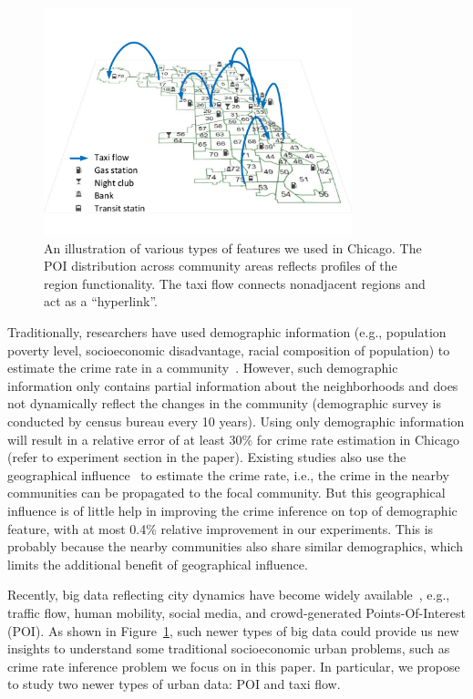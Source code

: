 \begin{figure}[t]
\centering
\includegraphics[width=0.8\textwidth]{fig/demo.pdf}
\caption{An illustration of various types of features we used in Chicago. The POI distribution across community areas reflects profiles of the region functionality. The taxi flow connects nonadjacent regions and act as a ``hyperlink''.}
\label{fig:demo}
\end{figure}

Traditionally, researchers have used demographic information (e.g., population poverty level, socioeconomic disadvantage, racial composition of population) to estimate the crime rate in a community~\cite{GrSa09}. However,  such demographic information only contains partial information about the neighborhoods and does not dynamically reflect the changes in the community (demographic survey is conducted by census bureau every 10 years). Using only demographic information will result in a relative error of at least 30\% for crime rate estimation in Chicago (refer to experiment section in the paper). Existing studies also use the geographical influence~\cite{Ans02} to estimate the crime rate, i.e., the crime in the nearby communities can be propagated to the focal community. But this geographical influence is of little help in improving the crime inference on top of demographic feature, with at most 0.4\% relative improvement in our experiments. This is probably because the nearby communities also share similar demographics, which limits the additional benefit of geographical influence.



Recently, big data reflecting city dynamics have become widely available~\cite{ZCWY14}, e.g., traffic flow, human mobility, social media, and crowd-generated Points-Of-Interest (POI). As shown in Figure~\ref{fig:demo}, such newer types of big data could provide us new insights to understand some traditional socioeconomic urban problems, such as crime rate inference problem we focus on in this paper. In particular, we propose to study two newer types of urban data: POI and taxi flow. 


